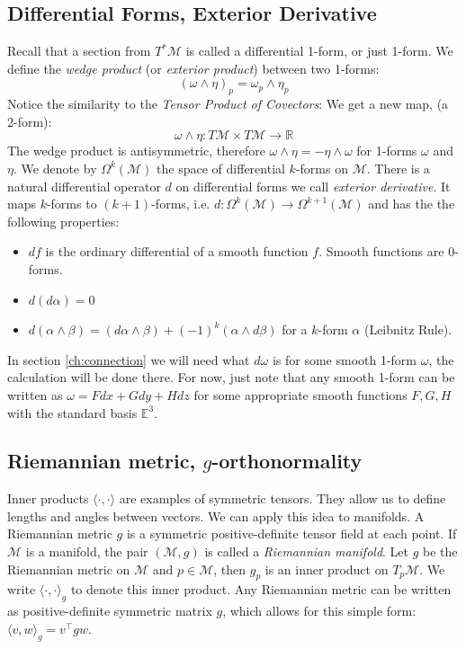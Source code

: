 \documentclass[../thesis.tex]{subfiles}
\begin{document}
\subsection{Differential Forms, Exterior Derivative}
Recall that a section from $T^*\mathcal{M}$ is called a differential 1-form, or just 1-form.
We define the \emph{wedge product} (or \emph{exterior product}) between two 1-forms:
$$(\omega \wedge \eta)_p = \omega_p \wedge \eta_p$$
Notice the similarity to the \emph{Tensor Product of Covectors}: We get a new map, (a 2-form):
$$\omega \wedge \eta: T\mathcal{M} \times T\mathcal{M} \to \mathbb{R}$$
The wedge product is antisymmetric, therefore $\omega \wedge \eta = -\eta \wedge \omega$ for 1-forms $\omega$ and $\eta$.
We denote by $\Omega^k(\mathcal{M})$ the space of differential $k$-forms on $\mathcal{M}$.
There is a natural differential operator $d$ on differential forms we call \emph{exterior derivative}.
It maps $k$-forms to $(k+1)$-forms, i.e. $d: \Omega^k(\mathcal{M}) \to \Omega^{k+1}(\mathcal{M})$
and has the the following properties:
\begin{itemize}
  \item $df$ is the ordinary differential of a smooth function $f$. Smooth functions are 0-forms.
  \item $d(d\alpha) = 0$
  \item $d(\alpha \wedge \beta) = (d\alpha \wedge \beta) + (-1)^k(\alpha \wedge d\beta)$ for a $k$-form $\alpha$ (Leibnitz Rule).
\end{itemize}
In section \ref{ch:connection} we will need what $d\omega$ is for some smooth 1-form $\omega$, the calculation
will be done there. For now, just note that 
any smooth 1-form can be written as $\omega = Fdx+Gdy+Hdz$ for some appropriate smooth functions $F,G,H$
with the standard basis $\mathbb{E}^3$.


\subsection{Riemannian metric, $g$-orthonormality}
Inner products $\langle \cdot , \cdot \rangle$ are examples of symmetric tensors. They allow us to define lengths and angles
between vectors. We can apply this idea to manifolds.
A Riemannian metric $g$ is a symmetric positive-definite tensor field at each point.
If $\mathcal{M}$ is a manifold, the pair $(\mathcal{M},g)$ is called a \emph{Riemannian manifold}.
Let $g$ be the Riemannian metric on $\mathcal{M}$ and $p\in \mathcal{M}$,
then $g_p$ is an inner product on $T_p\mathcal{M}$. We write $\langle \cdot, \cdot\rangle_g$ to denote this inner product.
Any Riemannian metric can be written as positive-definite symmetric matrix $g$, which allows for this simple form: $\langle v,w\rangle_g = v^{\top}gw$.
\end{document}
